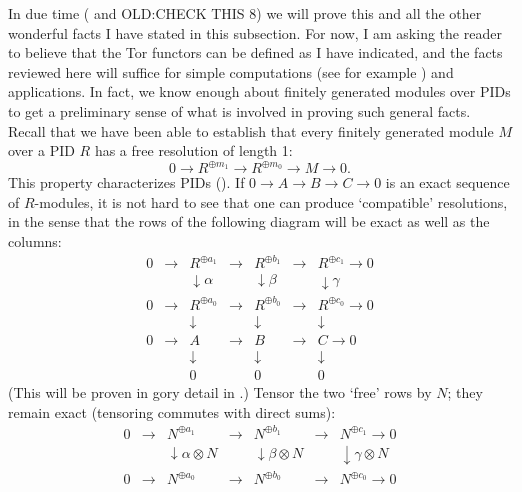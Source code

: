 In due time ( and OLD:CHECK THIS 8) we will prove
this and all the other wonderful facts I have stated in this
subsection. For now, I am asking the reader to believe that the Tor
functors can be defined as I have indicated, and the facts reviewed
here will suffice for simple computations (see for example
)
and applications.  In fact, we know enough
about finitely generated modules over PIDs to get a preliminary sense
of what is involved in proving such general facts. Recall that we have
been able to establish that every finitely generated module $M$ over a
PID $R$ has a free resolution of length 1:
\[
  0 \to R^{\oplus m_1} \to R^{\oplus m_0} \to M \to 0.
\]
This property characterizes PIDs
(). If
$0 \to A \to B \to C \to 0$ is an exact sequence of $R$-modules, it is
not hard to see that one can produce `compatible' resolutions, in the
sense that the rows of the following diagram will be exact as well as
the columns:
\[
  \begin{array}{ccccccc}
    0 & \to & R^{\oplus a_1} & \to & R^{\oplus b_1} & \to &
                                                            R^{\oplus c_1} \to 0 \\
      & & \downarrow\alpha & & \downarrow\beta & &
                                                   \downarrow\gamma \\
    0 & \to & R^{\oplus a_0} & \to & R^{\oplus b_0} & \to &
                                                            R^{\oplus c_0} \to 0 \\
      & & \downarrow & & \downarrow & & \downarrow \\
    0 & \to & A & \to & B & \to & C \to 0 \\
      & & \downarrow & & \downarrow & & \downarrow \\
      & & 0 & & 0 & & 0
  \end{array}
\]
(This will be proven in gory detail in
.) Tensor the two `free' rows by
$N$; they remain exact (tensoring commutes with direct sums):
\[
  \begin{array}{ccccccc}
    0 & \to & N^{\oplus a_1} & \to & N^{\oplus b_1} & \to &
                                                            N^{\oplus c_1} \to 0 \\
      & & \downarrow{\alpha \otimes N} & & \downarrow{\beta \otimes N} &
                                                          & \downarrow{\gamma \otimes N} \\
    0 & \to & N^{\oplus a_0} & \to & N^{\oplus b_0} & \to &
                                                            N^{\oplus c_0} \to 0
  \end{array}
\]
